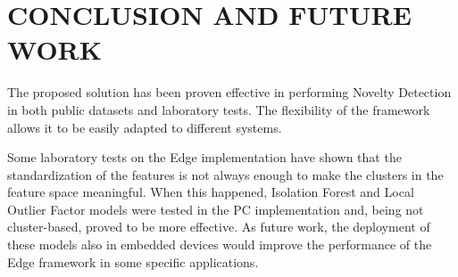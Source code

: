 \section{CONCLUSION AND FUTURE WORK}

The proposed solution has been proven effective in performing Novelty Detection in both public datasets and laboratory tests. The flexibility of the framework allows it to be easily adapted to different systems. 

Some laboratory tests on the Edge implementation have shown that the standardization of the features is not always enough to make the clusters in the feature space meaningful. When this happened, Isolation Forest and Local Outlier Factor models were tested in the PC implementation and, being not cluster-based, proved to be more effective. As future work, the deployment of these models also in embedded devices would improve the performance of the Edge framework in some specific applications.